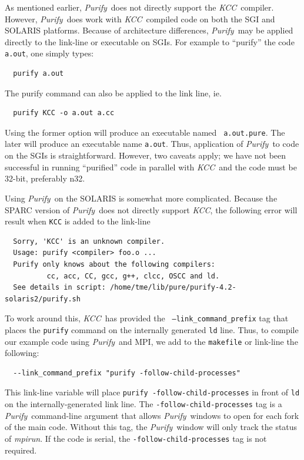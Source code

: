 \documentclass[note]{newmemo}
\newcommand{\purify}{\textsl{Purify}}
\newcommand{\KCC}{\textsl{KCC}}
\newcommand{\dir}[1]{\textsl{#1}}
\begin{document}
As mentioned earlier, \purify\ does not directly support the \KCC\ 
compiler.  However, \purify\ does work with \KCC\ compiled code on
both the SGI and SOLARIS platforms.  Because of architecture
differences, \purify\ may be applied directly to the link-line or
executable on SGIs.  For example to ``purify'' the code {\tt a.out},
one simply types:
\begin{verbatim}
  purify a.out
\end{verbatim}
The purify command can also be applied to the link line, ie.
\begin{verbatim}
  purify KCC -o a.out a.cc
\end{verbatim}
Using the former option will produce an executable named {\tt
  a.out.pure}.  The later will produce an executable name {\tt a.out}.
Thus, application of \purify\ to code on the SGIs is straightforward.
However, two caveats apply; we have not been successful in running
``purified'' code in parallel with \KCC\, and the code must be 32-bit,
preferably n32.

Using \purify\ on the SOLARIS is somewhat more complicated.  Because
the SPARC version of \purify\ does not directly support \KCC, the
following error will result when {\tt KCC} is added to the link-line
\begin{verbatim}
  Sorry, 'KCC' is an unknown compiler.
  Usage: purify <compiler> foo.o ...
  Purify only knows about the following compilers:
          cc, acc, CC, gcc, g++, clcc, OSCC and ld.
  See details in script: /home/tme/lib/pure/purify-4.2-solaris2/purify.sh
\end{verbatim}
To work around this, \KCC\ has provided the {\tt
  --link\_command\_prefix} tag that places the {\tt purify} command on
the internally generated {\tt ld} line.  Thus, to compile our example
code using \purify\ and MPI, we add to the {\tt makefile} or link-line 
the following:
\begin{verbatim}
  --link_command_prefix "purify -follow-child-processes"
\end{verbatim}
This link-line variable will place {\tt purify
  -follow-child-processes} in front of {\tt ld} on the
internally-generated link line.  The {\tt -follow-child-processes} tag 
is a \purify\ command-line argument that allows \purify\ windows to
open for each fork of the main code.  Without this tag, the \purify\
window will only track the status of \dir{mpirun}.  If the code is
serial, the {\tt -follow-child-processes} tag is not required.
\end{document}
